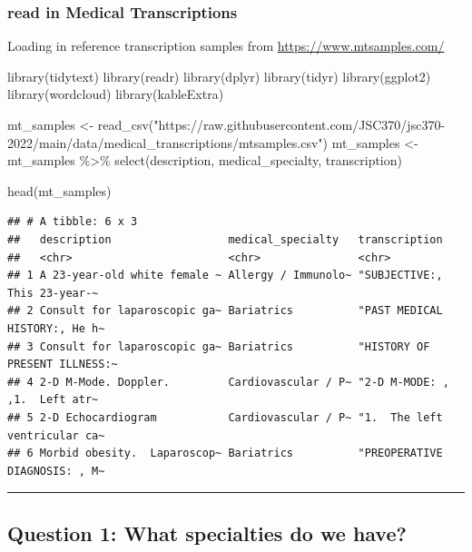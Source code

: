 \documentclass[
]{article}
\newenvironment{Shaded}{\begin{snugshade}}{\end{snugshade}}
\newcommand{\FunctionTok}[1]{\textcolor[rgb]{0.00,0.00,0.00}{#1}}
\newcommand{\NormalTok}[1]{#1}
\newcommand{\OtherTok}[1]{\textcolor[rgb]{0.56,0.35,0.01}{#1}}
\newcommand{\SpecialCharTok}[1]{\textcolor[rgb]{0.00,0.00,0.00}{#1}}
\newcommand{\StringTok}[1]{\textcolor[rgb]{0.31,0.60,0.02}{#1}}
\begin{document}
\hypertarget{read-in-medical-transcriptions}{%
\subsubsection{read in Medical
Transcriptions}\label{read-in-medical-transcriptions}}

Loading in reference transcription samples from
\url{https://www.mtsamples.com/}

\begin{Shaded}
\begin{Highlighting}[]
\FunctionTok{library}\NormalTok{(tidytext)}
\FunctionTok{library}\NormalTok{(readr)}
\FunctionTok{library}\NormalTok{(dplyr)}
\FunctionTok{library}\NormalTok{(tidyr)}
\FunctionTok{library}\NormalTok{(ggplot2)}
\FunctionTok{library}\NormalTok{(wordcloud)}
\FunctionTok{library}\NormalTok{(kableExtra)}

\NormalTok{mt\_samples }\OtherTok{\textless{}{-}} \FunctionTok{read\_csv}\NormalTok{(}\StringTok{"https://raw.githubusercontent.com/JSC370/jsc370{-}2022/main/data/medical\_transcriptions/mtsamples.csv"}\NormalTok{)}
\NormalTok{mt\_samples }\OtherTok{\textless{}{-}}\NormalTok{ mt\_samples }\SpecialCharTok{\%\textgreater{}\%}
  \FunctionTok{select}\NormalTok{(description, medical\_specialty, transcription)}

\FunctionTok{head}\NormalTok{(mt\_samples)}
\end{Highlighting}
\end{Shaded}

\begin{verbatim}
## # A tibble: 6 x 3
##   description                  medical_specialty   transcription                
##   <chr>                        <chr>               <chr>                        
## 1 A 23-year-old white female ~ Allergy / Immunolo~ "SUBJECTIVE:,  This 23-year-~
## 2 Consult for laparoscopic ga~ Bariatrics          "PAST MEDICAL HISTORY:, He h~
## 3 Consult for laparoscopic ga~ Bariatrics          "HISTORY OF PRESENT ILLNESS:~
## 4 2-D M-Mode. Doppler.         Cardiovascular / P~ "2-D M-MODE: , ,1.  Left atr~
## 5 2-D Echocardiogram           Cardiovascular / P~ "1.  The left ventricular ca~
## 6 Morbid obesity.  Laparoscop~ Bariatrics          "PREOPERATIVE DIAGNOSIS: , M~
\end{verbatim}

\begin{center}\rule{0.5\linewidth}{0.5pt}\end{center}

\hypertarget{question-1-what-specialties-do-we-have}{%
\subsection{Question 1: What specialties do we
have?}\label{question-1-what-specialties-do-we-have}}
\end{document}
